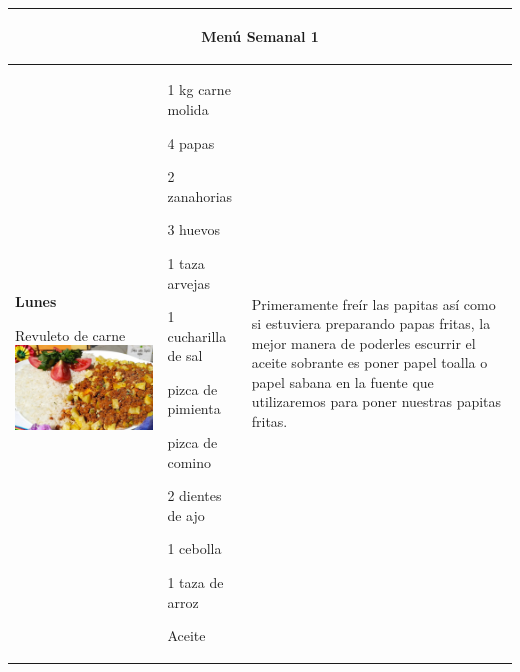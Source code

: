 \documentclass[menu.tex]{subfiles}
\begin{document}
    
\begin{tabular} {p{3.5cm} p{4cm} p{9cm}}
\multicolumn{3}{c}{\begin{LARGE}Menú Semanal 1\end{LARGE}}\\
\hline

    \pbox{20cm}
    {
        \rule{0pt}{3ex}\begin{large}\textbf{Lunes}\end{large}\\ 
        \rule{0pt}{2ex}Revuleto de carne \\
        \includegraphics[scale=0.2]{revuelto-de-carne} 
    } & 
    \vspace{-1.8cm}            
    \begin{compactitem} 
        \begin{scriptsize}
            \item 1 kg carne molida
            \item 4 papas
            \item 2 zanahorias
            \item 3 huevos
            \item 1 taza arvejas
            \item 1 cucharilla de sal
            \item pizca de pimienta
            \item pizca de comino
            \item 2 dientes de ajo
            \item 1 cebolla
            \item 1 taza de arroz
            \item Aceite
        \end{scriptsize}
    \end{compactitem}&
    \vspace{-1.8cm}
    Primeramente freír las papitas así como si estuviera preparando papas fritas, la mejor manera de poderles escurrir el aceite sobrante es poner papel toalla o papel sabana en la fuente que utilizaremos para poner nuestras papitas fritas.


\end{tabular}
\end{document}
